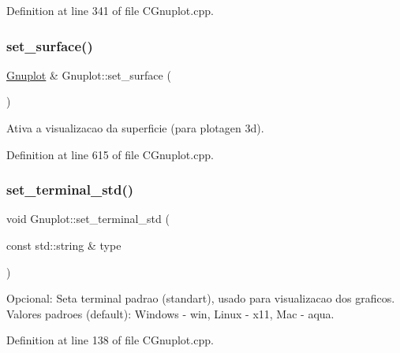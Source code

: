 Definition at line 341 of file C\+Gnuplot.\+cpp.

\mbox{\label{class_gnuplot_a0e36dcd81618234c6cdd135a9e1eee2b}} 
\subsubsection{\texorpdfstring{set\+\_\+surface()}{set\_surface()}}
{\footnotesize\ttfamily \hyperlink{class_gnuplot}{Gnuplot} \& Gnuplot\+::set\+\_\+surface (\begin{DoxyParamCaption}{ }\end{DoxyParamCaption})}



Ativa a visualizacao da superficie (para plotagen 3d). 



Definition at line 615 of file C\+Gnuplot.\+cpp.

\mbox{\label{class_gnuplot_a21feba7a3916708b742c3dc25850ab2f}} 
\subsubsection{\texorpdfstring{set\+\_\+terminal\+\_\+std()}{set\_terminal\_std()}}
{\footnotesize\ttfamily void Gnuplot\+::set\+\_\+terminal\+\_\+std (\begin{DoxyParamCaption}\item[{const std\+::string \&}]{type }\end{DoxyParamCaption})\hspace{0.3cm}{\ttfamily [static]}}



Opcional\+: Seta terminal padrao (standart), usado para visualizacao dos graficos. Valores padroes (default)\+: Windows -\/ win, Linux -\/ x11, Mac -\/ aqua. 



Definition at line 138 of file C\+Gnuplot.\+cpp.

\mbox{\label{class_gnuplot_aa693e806a115af1e2776a15078e75b46}} 
